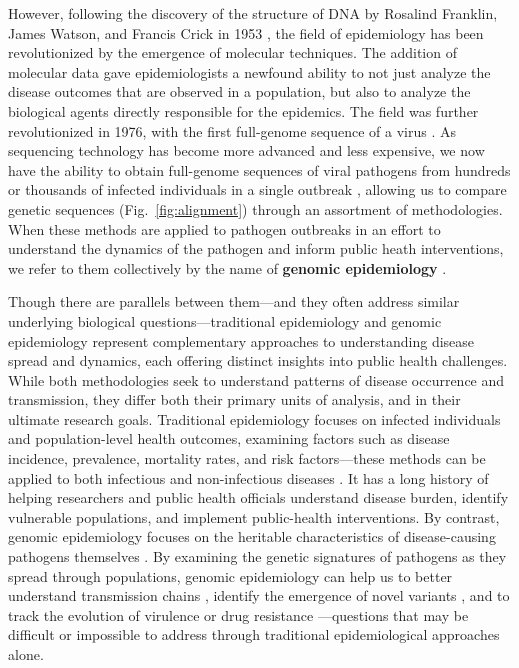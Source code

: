 However, following the discovery of the structure of DNA by Rosalind Franklin, James Watson, and Francis Crick in 1953 \citep{franklin1953molecular,watson1953molecular}, the field of epidemiology has been revolutionized by the emergence of molecular techniques.
The addition of molecular data gave epidemiologists a newfound ability to not just analyze the disease outcomes that are observed in a population, but also to analyze the biological agents directly responsible for the epidemics.
The field was further revolutionized in 1976, with the first full-genome sequence of a virus \citep{fiers1976complete}.
As sequencing technology has become more advanced and less expensive, we now have the ability to obtain full-genome sequences of viral pathogens from hundreds or thousands of infected individuals in a single outbreak \citep{du2021establishment}, allowing us to compare genetic sequences (Fig.~\ref{fig:alignment}) through an assortment of methodologies.
When these methods are applied to pathogen outbreaks in an effort to understand the dynamics of the pathogen and inform public heath interventions, we refer to them collectively by the name of \textbf{genomic epidemiology} \citep{armstrong2019pathogen,black2024applied}.

Though there are parallels between them---and they often address similar underlying biological questions---traditional epidemiology and genomic epidemiology represent complementary approaches to understanding disease spread and dynamics, each offering distinct insights into public health challenges.
While both methodologies seek to understand patterns of disease occurrence and transmission, they differ both their primary units of analysis, and in their ultimate research goals.
Traditional epidemiology focuses on infected individuals and population-level health outcomes, examining factors such as disease incidence, prevalence, mortality rates, and risk factors---these methods can be applied to both infectious and non-infectious diseases \citep{stamler1973epidemiology,cameron2019basal}.
It has a long history of helping researchers and public health officials understand disease burden, identify vulnerable populations, and implement public-health interventions.
By contrast, genomic epidemiology focuses on the heritable characteristics of disease-causing pathogens themselves \citep{armstrong2019pathogen}.
By examining the genetic signatures of pathogens as they spread through populations, genomic epidemiology can help us to better understand transmission chains \citep{xu2020transmission}, identify the emergence of novel variants \citep{dudas2021emergence}, and to track the evolution of virulence or drug resistance \citep{stanczak2015within}---questions that may be difficult or impossible to address through traditional epidemiological approaches alone.

